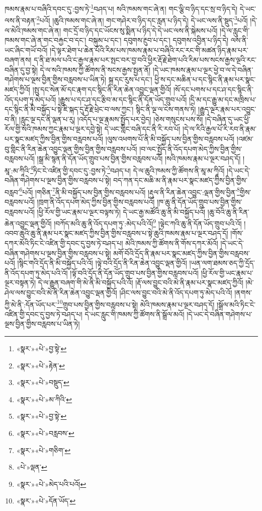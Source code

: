 ཁམས་རྣམ་པ་བཞིའི་དབང་དུ་:བྱས་ཏེ་\footnote{«སྣར་»«པེ་»བྱ་སྟེ་}བཤད་པ། སའི་ཁམས་གང་ཞེ་ན། གང་ལྕི་བ་ཉིད་དང་སྲ་བ་ཉིད་དེ། དེ་ཡང་ལས་ནི་བརྟན་\footnote{«སྣར་»«པེ་»རྟེན་}པའོ། །ཆུའི་ཁམས་གང་ཞེ་ན། གང་གཤེར་བ་ཉིད་དང་རླན་པ་ཉིད་དེ། དེ་ཡང་ལས་ནི་སྡུད་\footnote{«སྣར་»«པེ་»བསྡུད་}པའོ། །དེ་ལ་མེའི་ཁམས་གང་ཞེ་ན། གང་དྲོ་བ་ཉིད་དང་ཡོངས་སུ་སྨིན་པ་ཉིད་དེ་དེ་ཡང་ལས་ནི་སྐེམས་པའོ། །དེ་ལ་རླུང་གི་ཁམས་གང་ཞེ་ན་གང་བརྐྱང་བ་དང་། བསྐུམ་པ་དང་། དབུགས་རྔུབ་པ་དང་། དབུགས་འབྱིན་པ་ཉིད་དེ། ལས་ནི་ཡང་ཞིང་གཡོ་བའོ། །དེ་ལྟར་ཐེག་པ་ཆེན་པོའི་རིམ་པས་ཁམས་རྣམ་པ་བཞིའི་རང་རང་གི་མཚན་ཉིད་རྣམ་པར་བཞག་ནས། ད་ནི་ཐ་མལ་པའི་ང་རྒྱལ་རྣམ་པར་སྤང་བར་བྱ་བའི་ཕྱིར་རྡོ་རྗེ་ཐེག་པའི་རིམ་པས་སངས་རྒྱས་ལྔའི་རང་བཞིན་དུ་བྱ་སྟེ། དེ་ལ་སའི་ཁམས་ཀྱི་ཚོགས་ནི་སངས་རྒྱས་སྤྱན་ནོ། །དེ་ཡང་ཁམས་རྣམ་པ་ལྔར་ཕྱེ་བ་ལ་དེ་བཞིན་གཤེགས་པ་ལྔས་བྱིན་གྱིས་བརླབས་པ་ཡིན་ཏེ། སྐྲ་དང་རུས་པ་དང་། ཕྱི་ས་དང་མཆིན་པ་དང་སྙིང་ནི་རྣམ་པར་སྣང་མཛད་ཀྱིའོ། །སྤུ་དང་སེན་མོ་དང་རྣག་དང་སྙིང་ནི་རིན་ཆེན་འབྱུང་ལྡན་གྱིའོ། །སོ་དང་པགས་པ་དང་ཤ་དང་སྙིང་ནི་འོད་དཔག་ཏུ་མེད་པའོ། །རྒྱུས་པ་དང་ཤ་དང་རྩིབ་མ་དང་སྙིང་ནི་དོན་ཡོད་གྲུབ་པའོ། །དྲི་མ་དང་རྒྱུ་མ་དང་མཁྲིས་པ་དང་སྙིང་ནི་མི་བསྐྱོད་པ་སྟེ་ཇི་སྐད་དུ་རྡོ་རྗེ་ཕྲེང་བ་ལས་ཀྱང་། སྙིང་ནི་ལྔ་ལ་ངེས་གནས་ཏེ། །རྒྱུད་ལྔར་རྣམ་པར་འབྱུང་བ་ནི། །རླུང་ལྔ་དང་ནི་ལྡན་པ་རུ། །འདོད་པ་ལྔ་རྣམས་སྤྱོད་པར་བྱེད། །ཅེས་གསུངས་པས་སོ། །དེ་བཞིན་དུ་ཡང་ཕྱི་རོལ་གྱི་སའི་ཁམས་ཀྱང་རྣམ་པ་ལྔར་དབྱེ་སྟེ། དེ་ཡང་གླིང་བཞི་དང་ནི་རི་རབ་པོ། །དེ་ལ་རིའི་རྒྱལ་པོ་རི་རབ་ནི་རྣམ་པར་སྣང་མཛད་ཀྱིས་བྱིན་གྱིས་བརླབས་པའོ། །ལུས་འཕགས་པོ་ནི་མི་བསྐྱོད་པས་བྱིན་གྱིས་བརླབས་པའོ། །འཛམ་བུ་གླིང་ནི་རིན་ཆེན་འབྱུང་ལྡན་གྱིས་བྱིན་གྱིས་བརླབས་པའོ། །བ་ལང་སྤྱོད་ནི་འོད་དཔག་མེད་ཀྱིས་བྱིན་གྱིས་བརླབས་པའོ། །སྒྲ་མི་སྙན་ནི་དོན་ཡོད་གྲུབ་པས་བྱིན་གྱིས་བརླབས་པའོ། །སའི་ཁམས་རྣམ་པ་ལྔར་བཤད་དོ། །མཱ་:མ་ཀཱིའི་\footnote{«སྣར་»«པེ་»མ་ཀིའི་}ཏིང་ངེ་འཛིན་གྱི་དབང་དུ་:བྱས་ཏེ་\footnote{«སྣར་»«པེ་»བྱ་སྟེ་}བཤད་པ། དེ་ལ་ཆུའི་ཁམས་ཀྱི་ཚོགས་ནི་མཱ་མ་ཀཱིའོ། །དེ་ཡང་དེ་བཞིན་གཤེགས་པ་ལྔས་བྱིན་གྱིས་བརླབས་པ་སྟེ། བད་ཀན་དང་མཆི་མ་ནི་རྣམ་པར་སྣང་མཛད་ཀྱིས་བྱིན་གྱིས་བརླབ་\footnote{«སྣར་»«པེ་»བརླབས་}པའོ། །གཅིན་\footnote{«སྣར་»«པེ་»གཅིག་}ནི་མི་བསྐྱོད་པས་བྱིན་གྱིས་བརླབས་པའོ། །རྡུལ་ནི་རིན་ཆེན་འབྱུང་:ལྡན་གྱིས་བྱིན་\footnote{«པེ་»ལྡན་}གྱིས་བརླབས་པའོ། །ཁྲག་ནི་འོད་དཔག་མེད་ཀྱིས་བྱིན་གྱིས་བརླབས་པའོ། །ཁ་ཆུ་ནི་དོན་ཡོད་གྲུབ་པས་བྱིན་གྱིས་བརླབས་པའོ། །ཕྱི་རོལ་གྱི་ཡང་རྣམ་པ་ལྔར་བལྟས་ཏེ། དེ་ཡང་རྒྱ་མཚོའི་ཆུ་ནི་མི་བསྐྱོད་པའོ། །ཆུ་བོའི་ཆུ་ནི་རིན་ཆེན་འབྱུང་ལྡན་གྱིའོ། །བཀོད་མའི་ཆུ་ནི་འོད་དཔག་ཏུ་:མེད་པའི་འོ།\footnote{«སྣར་»«པེ་»མེད་པའི་པའོ།} །ལྟེང་ཀའི་ཆུ་ནི་དོན་ཡོད་གྲུབ་པའི་འོ། །འབབ་ཆུའི་ཆུ་ནི་རྣམ་པར་སྣང་མཛད་ཀྱིས་བྱིན་གྱིས་བརླབས་པ་སྟེ་ཆུའི་ཁམས་རྣམ་པ་ལྔར་བཤད་དོ། །གོས་དཀར་མོའི་ཏིང་ངེ་འཛིན་གྱི་དབང་དུ་བྱས་ཏེ་བཤད་པ། མེའི་ཁམས་ཀྱི་ཚོགས་ནི་གོས་དཀར་མོའོ། །དེ་ཡང་དེ་བཞིན་གཤེགས་པ་ལྔས་བྱིན་གྱིས་བརླབས་པ་སྟེ། མགོ་བོའི་དྲོད་ནི་རྣམ་པར་སྣང་མཛད་ཀྱིས་བྱིན་གྱིས་བརླབས་པའོ། །སྙིང་གའི་དྲོད་ནི་མི་བསྐྱོད་པའི་འོ། །ལྟེ་བའི་དྲོད་ནི་རིན་ཆེན་འབྱུང་ལྡན་གྱིའོ། །ཡན་ལག་ཐམས་ཅད་ཀྱི་དྲོད་ནི་འོད་དཔག་ཏུ་མེད་པའི་འོ། །ལྟོ་བའི་དྲོད་ནི་དོན་ཡོད་གྲུབ་པས་བྱིན་གྱིས་བརླབས་པའོ། །ཕྱི་རོལ་གྱི་ཡང་རྣམ་པ་ལྔར་བསྟན་ཏེ། དེ་ལ་རྒྱུན་བཞག་གི་མེ་ནི་མི་བསྐྱོད་པའི་འོ། །རྡོ་ལས་བྱུང་བའི་མེ་ནི་རྣམ་པར་སྣང་མཛད་ཀྱིའོ། །མེ་ཤེལ་ལས་བྱུང་བའི་མེ་ནི་རིན་ཆེན་འབྱུང་ལྡན་གྱིའོ། །ཤིང་ལས་བྱུང་བའི་མེ་ནི་འོད་དཔག་ཏུ་མེད་པའི་འོ། །ནགས་ཀྱི་མེ་ནི་:དོན་ཡོད་པར་\footnote{«སྣར་»«པེ་»དོན་ཡོད་}གྲུབ་པས་བྱིན་གྱིས་བརླབས་པ་སྟེ། མེའི་ཁམས་རྣམ་པ་ལྔར་བཤད་དོ། །སྒྲོལ་མའི་ཏིང་ངེ་འཛིན་གྱི་དབང་དུ་བྱས་ཏེ་བཤད་པ། དེ་ཡང་རླུང་གི་ཁམས་ཀྱི་ཚོགས་ནི་སྒྲོལ་མའོ། །དེ་ཡང་དེ་བཞིན་གཤེགས་པ་ལྔས་བྱིན་གྱིས་བརླབས་པ་ཡིན་ཏེ། 